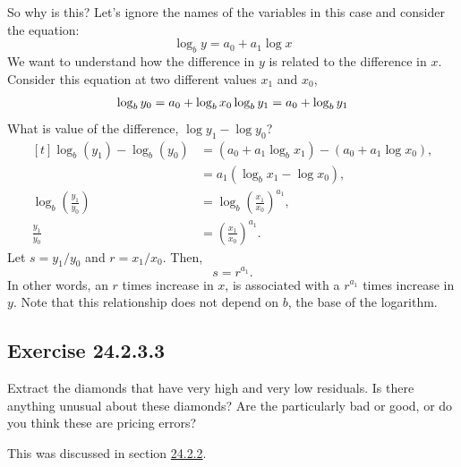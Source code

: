 \documentclass[]{book}
\theoremstyle{plain}
\theoremstyle{remark}
\begin{document}
So why is this?
Let's ignore the names of the variables in this case and consider the equation:
\[
\log_b y = a_0 + a_1 \log x
\]
We want to understand how the difference in \(y\) is related to the difference in \(x\).
Consider this equation at two different values \(x_1\) and \(x_0\),
\[
\log_b y_0 = a_0 + \log_b x_0 \\
\log_b y_1 = a_0 + \log_b y_1
\]
What is value of the difference, \(\log y_1 - \log y_0\)?
\[
\begin{aligned}[t]
\log_b(y_1) - \log_b(y_0) &= (a_0 + a_1 \log_b x_1) - (a_0 + a_1 \log x_0) ,\\
&= a_1 (\log_b x_1 - \log x_0) , \\
\log_b \left(\frac{y_1}{y_0} \right) &= \log_b \left(\frac{x_1}{x_0} \right)^{a_1} , \\
\frac{y_1}{y_0} &=  \left( \frac{x_1}{x_0} \right)^{a_1} .
\end{aligned}
\]
Let \(s = y_1 / y_0\) and \(r = x_1 / x_0\). Then,
\[
s =  r^{a_1} \text{.}
\]
In other words, an \(r\) times increase in \(x\), is associated with a \(r^{a_1}\) times increase in \(y\).
Note that this relationship does not depend on \(b\), the base of the logarithm.

\hypertarget{exercise-24.2.3.3}{%
\subsection*{\texorpdfstring{Exercise {24.2.3.3}}{Exercise 24.2.3.3}}\label{exercise-24.2.3.3}}

Extract the diamonds that have very high and very low residuals. Is there anything unusual about these diamonds? Are the particularly bad or good, or do you think these are pricing errors?

This was discussed in section \href{https://r4ds.had.co.nz/model-building.html\#a-more-complicated-model}{24.2.2}.
\end{document}
